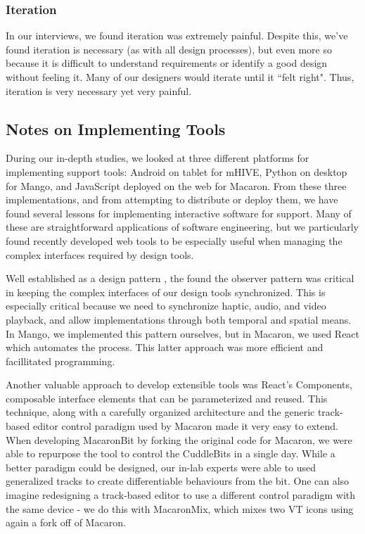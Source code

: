 %
%
\subsubsection{Iteration}
In our interviews, we found iteration was extremely painful.
Despite this, we've found iteration is necessary (as with all design processes), but even more so because it is difficult to understand requirements or identify a good design without feeling it.
Many of our designers would iterate until it ``felt right".
Thus, iteration is very necessary yet very painful.




%
%
\subsection{Notes on Implementing \haxd Tools}
During our in-depth studies, we looked at three different platforms for implementing \haxd support tools: Android on tablet for mHIVE, Python on desktop for Mango, and JavaScript deployed on the web for Macaron.
From these three implementations, and from attempting to distribute or deploy them, we have found several lessons for implementing interactive software for \haxd support.
Many of these are straightforward applications of software engineering, but we particularly found recently developed web tools to be especially useful when managing the complex interfaces required by design tools.

Well established as a design pattern \cite{}, the found the observer pattern was critical in keeping the complex interfaces of our design tools synchronized.
This is especially critical because we need to synchronize haptic, audio, and video playback, and allow implementations through both temporal and spatial means.
In Mango, we implemented this pattern ourselves, but in Macaron, we used React \cite{} which automates the process.
This latter approach was more efficient and facillitated programming.

Another valuable approach to develop extensible tools was React's Components, composable interface elements that can be parameterized and reused.
This technique, along with a carefully organized architecture and the generic track-based editor control paradigm used by Macaron made it very easy to extend.
When developing MacaronBit by forking the original code for Macaron, we were able to repurpose the tool to control the CuddleBits in a single day.
While a better paradigm could be designed, our in-lab experts were able to used generalized tracks to create differentiable behaviours from the bit.
One can also imagine redesigning a track-based editor to use a different control paradigm with the same device - we do this with MacaronMix, which mixes two VT icons using again a fork off of Macaron.


